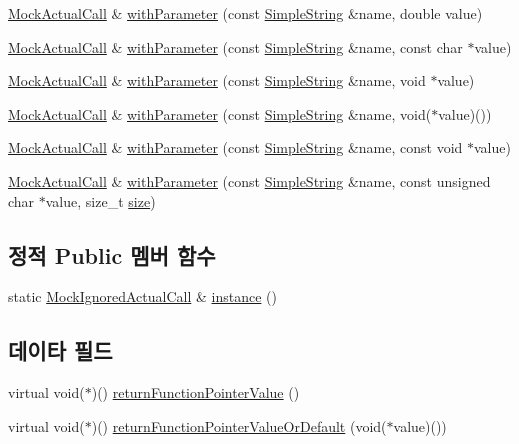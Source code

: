 \begin{DoxyCompactItemize}
\item 
\hyperlink{class_mock_actual_call}{Mock\+Actual\+Call} \& \hyperlink{class_mock_actual_call_ae2623cd5773f529096615eb84bc2a88d}{with\+Parameter} (const \hyperlink{class_simple_string}{Simple\+String} \&name, double value)
\item 
\hyperlink{class_mock_actual_call}{Mock\+Actual\+Call} \& \hyperlink{class_mock_actual_call_ab299726011d5c80eabc64589a07caab4}{with\+Parameter} (const \hyperlink{class_simple_string}{Simple\+String} \&name, const char $\ast$value)
\item 
\hyperlink{class_mock_actual_call}{Mock\+Actual\+Call} \& \hyperlink{class_mock_actual_call_a73f6c72584163c0853b8c76b61f5d8d2}{with\+Parameter} (const \hyperlink{class_simple_string}{Simple\+String} \&name, void $\ast$value)
\item 
\hyperlink{class_mock_actual_call}{Mock\+Actual\+Call} \& \hyperlink{class_mock_actual_call_a2179debe76f390842cb8f94786273f8d}{with\+Parameter} (const \hyperlink{class_simple_string}{Simple\+String} \&name, void($\ast$value)())
\item 
\hyperlink{class_mock_actual_call}{Mock\+Actual\+Call} \& \hyperlink{class_mock_actual_call_a3d3f4588e0e927961590b55e117e898f}{with\+Parameter} (const \hyperlink{class_simple_string}{Simple\+String} \&name, const void $\ast$value)
\item 
\hyperlink{class_mock_actual_call}{Mock\+Actual\+Call} \& \hyperlink{class_mock_actual_call_a59ab8948e17207f3bb15facb8869e266}{with\+Parameter} (const \hyperlink{class_simple_string}{Simple\+String} \&name, const unsigned char $\ast$value, size\+\_\+t \hyperlink{gst__avb__playbin_8c_a439227feff9d7f55384e8780cfc2eb82}{size})
\end{DoxyCompactItemize}
\subsection*{정적 Public 멤버 함수}
\begin{DoxyCompactItemize}
\item 
static \hyperlink{class_mock_ignored_actual_call}{Mock\+Ignored\+Actual\+Call} \& \hyperlink{class_mock_ignored_actual_call_ad0b0fbb69da407281d29af43261676e0}{instance} ()
\end{DoxyCompactItemize}
\subsection*{데이타 필드}
\begin{DoxyCompactItemize}
\item 
virtual void($\ast$)() \hyperlink{class_mock_ignored_actual_call_abd8adc7ad48025440b2a4aee485f560d}{return\+Function\+Pointer\+Value} ()
\item 
virtual void($\ast$)() \hyperlink{class_mock_ignored_actual_call_a49cb9d9fc33c535ac64a4ee6d95f7b80}{return\+Function\+Pointer\+Value\+Or\+Default} (void($\ast$value)())
\end{DoxyCompactItemize}


